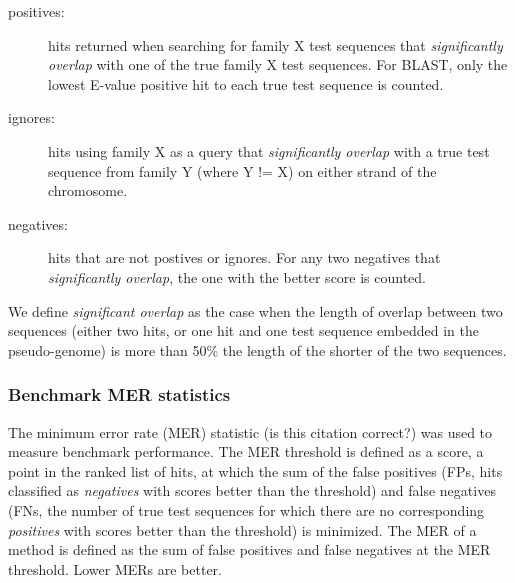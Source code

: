 \documentclass[11pt]{article}
\begin{document}
\begin{description}
\item[positives:]
  hits returned when searching for family X test sequences
  that \emph{significantly overlap}
  with one of the true family X test sequences. For \textsc{BLAST}, only the
  lowest E-value positive hit to each true test sequence is
  counted. 
\item[ignores:] 
  hits using family X as a query that \emph{significantly
    overlap} with a true test sequence
  from family Y (where Y != X) on either strand of the
  chromosome.%
\item[negatives:]
  hits that are not postives or ignores. %
  For any two negatives that \emph{significantly overlap},
  the one with the better score is counted.
\end{description}
  
We define \emph{significant overlap} as the case when 
the length of overlap between two sequences (either two hits, or one
hit and one test sequence embedded in the pseudo-genome)
is more than 50\% the length of the shorter of the two sequences.

\subsubsection{Benchmark MER statistics} 

The minimum error rate (MER) statistic \cite{Pearson95} (is this
citation correct?) was used to
measure benchmark performance. 
The MER threshold is defined as a score, a point in the ranked
list of hits, at which the sum of the false positives (FPs, hits
classified as \emph{negatives} with scores better than the threshold) and
false negatives (FNs, the number of true test sequences for which
there are no corresponding \emph{positives} with scores better than
the threshold) is minimized. The MER of a method is defined as the sum of false
positives and false negatives at the MER threshold. Lower MERs are better.
\end{document}
